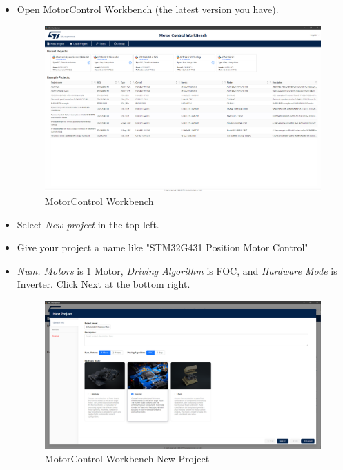 \documentclass[10pt]{article}
\begin{document}
            \begin{itemize}
                \item Open MotorControl Workbench (the latest version you have). 
                    \begin{figure}[H]
                        \centerline{\includegraphics[width=\textwidth]{References/MC Workbench.png}}
                        \caption{MotorControl Workbench}
                    \end{figure}
                \item Select \emph{New project} in the top left.
                \item Give your project a name like "STM32G431 Position Motor Control"
                \item \emph{Num. Motors} is 1 Motor, \emph{Driving Algorithm} is FOC, and \emph{Hardware Mode} is Inverter. Click Next at the bottom right.
                    \begin{figure}[H]
                        \centerline{\includegraphics[width=\textwidth]{References/MCW Position New Project.png}}
                        \caption{MotorControl Workbench New Project}

\end{figure}
\end{itemize}
\end{document}
